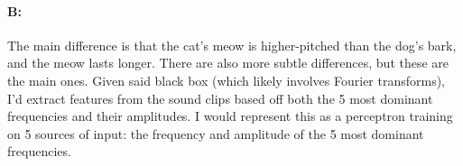 \documentclass{article}
\begin{document}
\paragraph{B: } The main difference is that the cat's meow is higher-pitched than the dog's bark, and the meow lasts longer. There are also more subtle differences, but these are the main ones. Given said black box (which likely involves Fourier transforms), I'd extract features from the sound clips based off both the 5 most dominant frequencies and their amplitudes. I would represent this as a perceptron training on 5 sources of input: the frequency and amplitude of the 5 most dominant frequencies.
\end{document}
